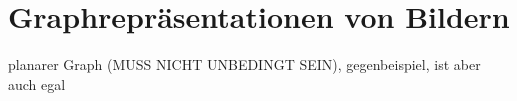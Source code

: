\chapter{Graphrepräsentationen von Bildern}

planarer Graph (MUSS NICHT UNBEDINGT SEIN), gegenbeispiel, ist aber auch egal
